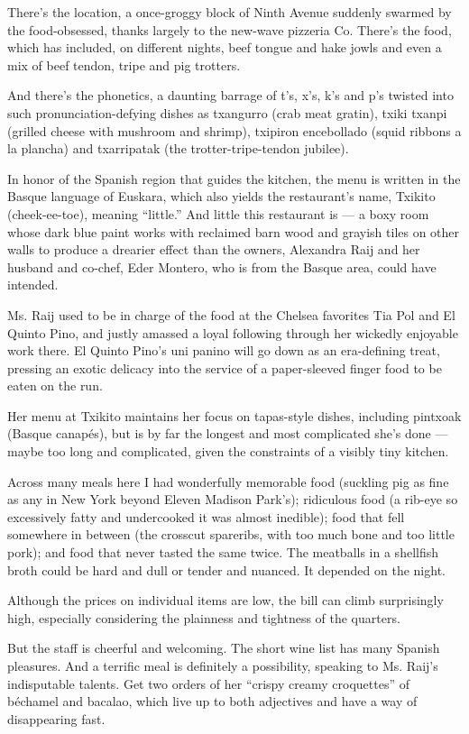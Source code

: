 There's the location, a once-groggy block of Ninth Avenue suddenly
swarmed by the food-obsessed, thanks largely to the new-wave pizzeria
Co. There's the food, which has included, on different nights, beef
tongue and hake jowls and even a mix of beef tendon, tripe and pig
trotters.

And there's the phonetics, a daunting barrage of t's, x's, k's and p's
twisted into such pronunciation-defying dishes as txangurro (crab meat
gratin), txiki txanpi (grilled cheese with mushroom and shrimp),
txipiron encebollado (squid ribbons a la plancha) and txarripatak (the
trotter-tripe-tendon jubilee).

In honor of the Spanish region that guides the kitchen, the menu is
written in the Basque language of Euskara, which also yields the
restaurant's name, Txikito (cheek-ee-toe), meaning ``little.'' And
little this restaurant is --- a boxy room whose dark blue paint works
with reclaimed barn wood and grayish tiles on other walls to produce a
drearier effect than the owners, Alexandra Raij and her husband and
co-chef, Eder Montero, who is from the Basque area, could have intended.

Ms. Raij used to be in charge of the food at the Chelsea favorites Tia
Pol and El Quinto Pino, and justly amassed a loyal following through her
wickedly enjoyable work there. El Quinto Pino's uni panino will go down
as an era-defining treat, pressing an exotic delicacy into the service
of a paper-sleeved finger food to be eaten on the run.

Her menu at Txikito maintains her focus on tapas-style dishes, including
pintxoak (Basque canapés), but is by far the longest and most
complicated she's done --- maybe too long and complicated, given the
constraints of a visibly tiny kitchen.

Across many meals here I had wonderfully memorable food (suckling pig as
fine as any in New York beyond Eleven Madison Park's); ridiculous food
(a rib-eye so excessively fatty and undercooked it was almost inedible);
food that fell somewhere in between (the crosscut spareribs, with too
much bone and too little pork); and food that never tasted the same
twice. The meatballs in a shellfish broth could be hard and dull or
tender and nuanced. It depended on the night.

Although the prices on individual items are low, the bill can climb
surprisingly high, especially considering the plainness and tightness of
the quarters.

But the staff is cheerful and welcoming. The short wine list has many
Spanish pleasures. And a terrific meal is definitely a possibility,
speaking to Ms. Raij's indisputable talents. Get two orders of her
``crispy creamy croquettes'' of béchamel and bacalao, which live up to
both adjectives and have a way of disappearing fast.

